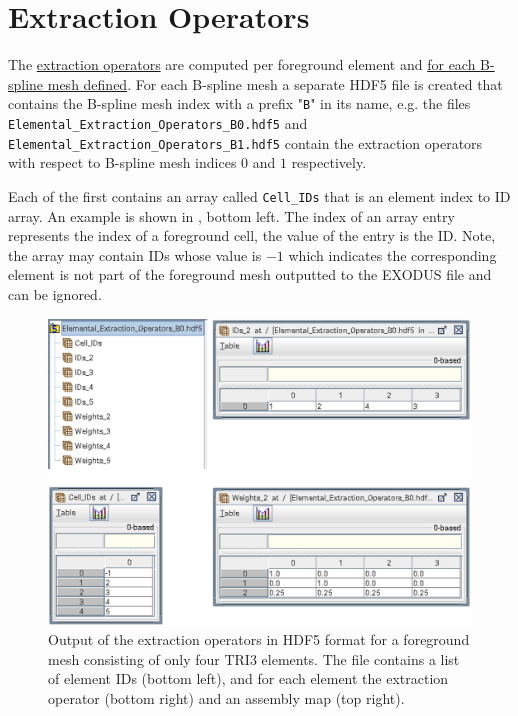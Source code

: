 \section{Extraction Operators}
\label{sec:tutorial_extraction_ops}

The \hyperref[eq:extraction_operator]{extraction operators} are computed per foreground element and \hyperlink{bspline_mesh_definition}{for each B-spline mesh defined}. For each B-spline mesh a separate HDF5 file is created that contains the B-spline mesh index with a prefix "\texttt{B}" in its name, 
\newline e.g. the files \texttt{Elemental\_Extraction\_Operators\_B0.hdf5} and
\newline \texttt{Elemental\_Extraction\_Operators\_B1.hdf5} contain the extraction operators with respect to B-spline mesh indices $0$ and $1$ respectively.

\vspace{0.2cm}

Each of the first contains an array called \texttt{Cell\_IDs} that is an element index to ID array. An example is shown in , bottom left. The index of an array entry represents the index of a foreground cell, the value of the entry is the ID. Note, the array may contain IDs whose value is $-1$ which indicates the corresponding element is not part of the foreground mesh outputted to the EXODUS file and can be ignored.

\begin{figure}[h]
    \begin{center}
    \includegraphics[width=13cm]{Figures/extraction_operator_output.png}
    \caption{Output of the extraction operators in HDF5 format for a foreground mesh consisting of only four TRI3 elements. The file contains a list of element IDs (bottom left), and for each element the extraction operator (bottom right) and an assembly map (top right).} 
    \label{fig:extraction_operator_output}
    \end{center}
\end{figure}

